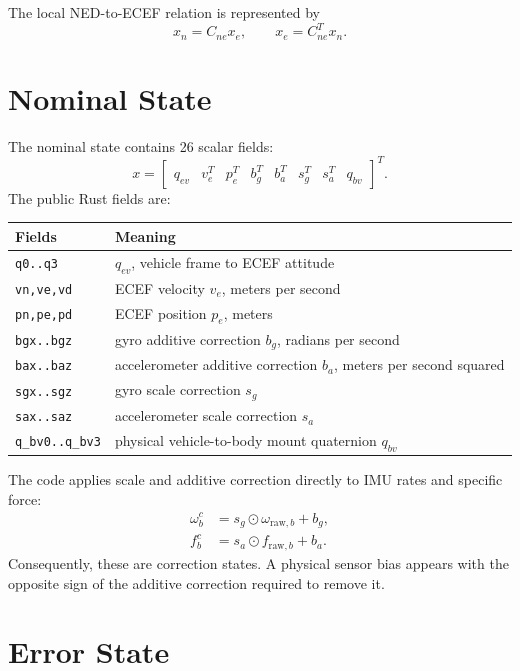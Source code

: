 \documentclass[11pt]{article}
\newcommand{\T}{^{T}}
\begin{document}
The local NED-to-ECEF relation is represented by
\begin{equation}
  x_n=C_{ne}x_e,\qquad x_e=C_{ne}\T x_n .
\end{equation}

\section{Nominal State}

The nominal state contains 26 scalar fields:
\begin{equation}
  x=
  \begin{bmatrix}
  q_{ev} & v_e\T & p_e\T & b_g\T & b_a\T &
  s_g\T & s_a\T & q_{bv}
  \end{bmatrix}\T .
\end{equation}
The public Rust fields are:
\begin{center}
\begin{tabular}{ll}
\toprule
Fields & Meaning \\
\midrule
\texttt{q0..q3} & \(q_{ev}\), vehicle frame to ECEF attitude \\
\texttt{vn,ve,vd} & ECEF velocity \(v_e\), meters per second \\
\texttt{pn,pe,pd} & ECEF position \(p_e\), meters \\
\texttt{bgx..bgz} & gyro additive correction \(b_g\), radians per second \\
\texttt{bax..baz} & accelerometer additive correction \(b_a\), meters per second squared \\
\texttt{sgx..sgz} & gyro scale correction \(s_g\) \\
\texttt{sax..saz} & accelerometer scale correction \(s_a\) \\
\texttt{q_bv0..q_bv3} & physical vehicle-to-body mount quaternion \(q_{bv}\) \\
\bottomrule
\end{tabular}
\end{center}

The code applies scale and additive correction directly to IMU rates and
specific force:
\begin{align}
  \omega_b^c &= s_g\odot\omega_{\mathrm{raw},b}+b_g,\\
  f_b^c &= s_a\odot f_{\mathrm{raw},b}+b_a.
\end{align}
Consequently, these are correction states. A physical sensor bias appears with
the opposite sign of the additive correction required to remove it.

\section{Error State}
\end{document}
